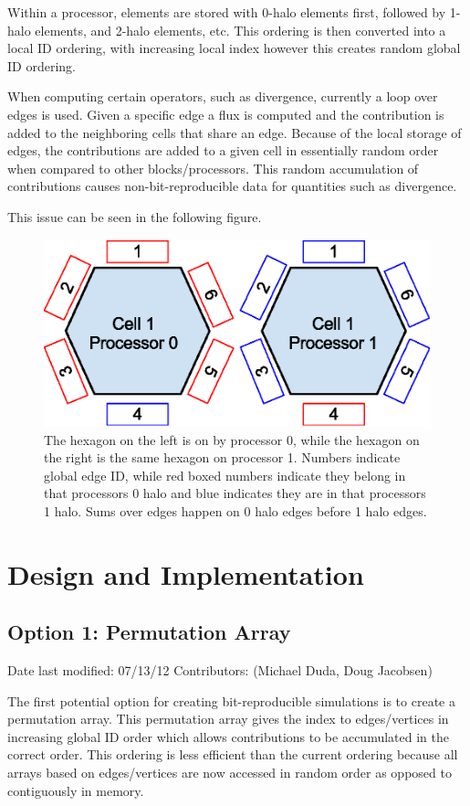 \documentclass[11pt]{report}
\begin{document}
Within a processor, elements are stored with 0-halo elements first, followed by 1-halo elements, and 2-halo elements, etc. This ordering is then converted into a local ID ordering, with increasing local index however this creates random global ID ordering.

When computing certain operators, such as divergence, currently a loop over edges is used. Given a specific edge a flux is computed and the contribution is added to the neighboring cells that share an edge. Because of the local storage of edges, the contributions are added to a given cell in essentially random order when compared to other blocks/processors. This random accumulation of contributions causes non-bit-reproducible data for quantities such as divergence.

This issue can be seen in the following figure.
\begin{figure}[H!]
	\centering
	\includegraphics[scale=0.75]{Hexagons-NonBR.eps}
	\caption{The hexagon on the left is on by processor 0, while the hexagon on
	the right is the same hexagon on processor 1. Numbers indicate global edge
ID, while red boxed numbers indicate they belong in that processors 0 halo and
blue indicates they are in that processors 1 halo. Sums over edges happen on 0
halo edges before 1 halo edges.}
\end{figure}

\chapter{Design and Implementation}

\section{Option 1: Permutation Array}
Date last modified: 07/13/12
Contributors: (Michael Duda, Doug Jacobsen)

The first potential option for creating bit-reproducible simulations is to create a permutation array. This permutation array gives the index to edges/vertices in increasing global ID order which allows contributions to be accumulated in the correct order. This ordering is less efficient than the current ordering because all arrays based on edges/vertices are now accessed in random order as opposed to contiguously in memory.
\end{document}

